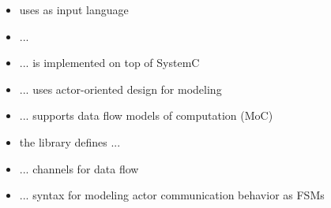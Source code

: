 \begin{frame}[t]
\begin{itemize}
\item \SystemCoDesigner{} uses \SysteMoC{} as input language
\end{itemize}
\begin{itemize}
\item \SysteMoC{} ... 
\item ... is implemented on top of SystemC
\item ... uses actor-oriented design for modeling 
\item ... supports data flow models of computation (MoC)
\end{itemize}
\end{frame}






\begin{frame}[t]
\begin{itemize}
\item the \SysteMoC{} library defines ...
\item ... channels for data flow
\item ... syntax for modeling actor communication behavior as FSMs
\end{itemize}
\begin{figure}
\centering
\resizebox{0.7\columnwidth}{!}{}
\end{figure}
\end{frame}








